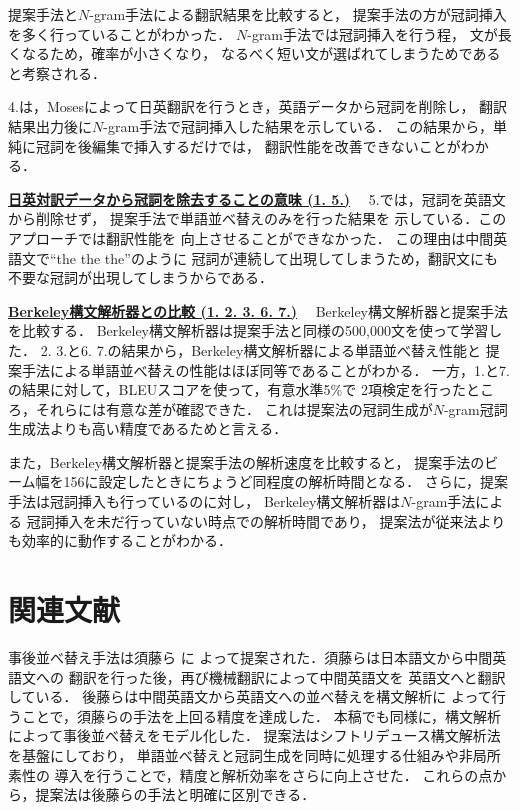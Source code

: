 \documentclass[japanese]{jnlp_1.4}
\begin{document}
提案手法と$N$-gram手法による翻訳結果を比較すると，
提案手法の方が冠詞挿入を多く行っていることがわかった．
$N$-gram手法では冠詞挿入を行う程，
文が長くなるため，確率が小さくなり，
なるべく短い文が選ばれてしまうためであると考察される．

4.は，Mosesによって日英翻訳を行うとき，英語データから冠詞を削除し，
翻訳結果出力後に$N$-gram手法で冠詞挿入した結果を示している．
この結果から，単純に冠詞を後編集で挿入するだけでは，
翻訳性能を改善できないことがわかる．


\vspace{1\Cvs}\noindent
\textbf{\underline{日英対訳データから冠詞を除去することの意味 (1. 5.)}}
　5.では，冠詞を英語文から削除せず， 
提案手法で単語並べ替えのみを行った結果を
示している．このアプローチでは翻訳性能を
向上させることができなかった．
この理由は中間英語文で``the the the''のように
冠詞が連続して出現してしまうため，翻訳文にも
不要な冠詞が出現してしまうからである．


\vspace{1\Cvs}\noindent
\textbf{\underline{Berkeley構文解析器との比較 (1. 2. 3. 6. 7.)}}
　Berkeley構文解析器と提案手法を比較する．
Berkeley構文解析器は提案手法と同様の500,000文を使って学習した．
2. 3.と6. 7.の結果から，Berkeley構文解析器による単語並べ替え性能と
提案手法による単語並べ替えの性能はほぼ同等であることがわかる．
一方，1.と7.の結果に対して，BLEUスコアを使って，有意水準5\%で
2項検定を行ったところ，それらには有意な差が確認できた．
これは提案法の冠詞生成が$N$-gram冠詞生成法よりも高い精度であるためと言える．

また，Berkeley構文解析器と提案手法の解析速度を比較すると，
提案手法のビーム幅を156に設定したときにちょうど同程度の解析時間となる．
さらに，提案手法は冠詞挿入も行っているのに対し， 
Berkeley構文解析器は$N$-gram手法による
冠詞挿入を未だ行っていない時点での解析時間であり，
提案法が従来法よりも効率的に動作することがわかる．


\section{関連文献}

事後並べ替え手法は須藤ら \cite{Sudoh:11}に
よって提案された．須藤らは日本語文から中間英語文への
翻訳を行った後，再び機械翻訳によって中間英語文を
英語文へと翻訳している．
後藤らは中間英語文から英語文への並べ替えを構文解析に
よって行うことで，須藤らの手法を上回る精度を達成した．
本稿でも同様に，構文解析によって事後並べ替えをモデル化した．
提案法はシフトリデュース構文解析法を基盤にしており，
単語並べ替えと冠詞生成を同時に処理する仕組みや非局所素性の
導入を行うことで，精度と解析効率をさらに向上させた．
これらの点から，提案法は後藤らの手法と明確に区別できる．
\end{document}
